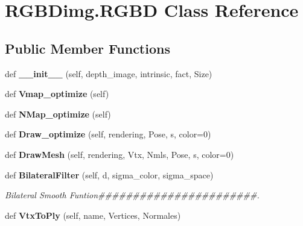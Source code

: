 \section{R\+G\+B\+Dimg.\+R\+G\+BD Class Reference}
\label{class_r_g_b_dimg_1_1_r_g_b_d}
\subsection*{Public Member Functions}
\begin{DoxyCompactItemize}
\item 
\mbox{\label{class_r_g_b_dimg_1_1_r_g_b_d_ab406cbaee6fa8595b5703080e767d0c5}} 
def {\bfseries \+\_\+\+\_\+init\+\_\+\+\_\+} (self, depth\+\_\+image, intrinsic, fact, Size)
\item 
\mbox{\label{class_r_g_b_dimg_1_1_r_g_b_d_ae692aea94d3a3f43a31fce73032159a5}} 
def {\bfseries Vmap\+\_\+optimize} (self)
\item 
\mbox{\label{class_r_g_b_dimg_1_1_r_g_b_d_adb50148eae6851e6a0ce88668a7a9b59}} 
def {\bfseries N\+Map\+\_\+optimize} (self)
\item 
\mbox{\label{class_r_g_b_dimg_1_1_r_g_b_d_a654bcd74f0a0a8571c6398aec317b63f}} 
def {\bfseries Draw\+\_\+optimize} (self, rendering, Pose, s, color=0)
\item 
\mbox{\label{class_r_g_b_dimg_1_1_r_g_b_d_a66434a5000cda39cb6f461a8819fb780}} 
def {\bfseries Draw\+Mesh} (self, rendering, Vtx, Nmls, Pose, s, color=0)
\item 
\mbox{\label{class_r_g_b_dimg_1_1_r_g_b_d_a7145a918e0f09a0eea38e956f2a00cb5}} 
def \textbf{ Bilateral\+Filter} (self, d, sigma\+\_\+color, sigma\+\_\+space)
\begin{DoxyCompactList}\small\item\em Bilateral Smooth Funtion\#\#\#\#\#\#\#\#\#\#\#\#\#\#\#\#\#\#\#\#\#\#\#. \end{DoxyCompactList}\item 
\mbox{\label{class_r_g_b_dimg_1_1_r_g_b_d_a0b4c539e3633d1bdf4f929e56af1316b}} 
def {\bfseries Vtx\+To\+Ply} (self, name, Vertices, Normales)
\end{DoxyCompactItemize}
